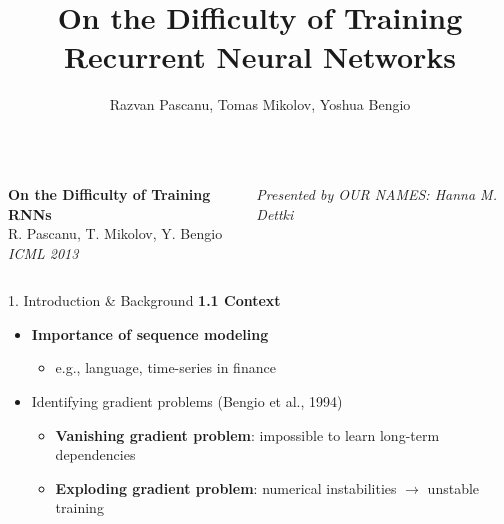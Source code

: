 \documentclass[final]{beamer}
\title{On the Difficulty of Training Recurrent Neural Networks}
\author{Razvan Pascanu, Tomas Mikolov, Yoshua Bengio}
\institute{ICML 2013}
\begin{document}
\begin{frame}[t]
    \begin{columns}[t,totalwidth=\textwidth]
    \begin{column}{0.66\textwidth}
      \vspace{1em}
      {\centering
        {\veryHuge\bfseries On the Difficulty of Training RNNs}\\[0.5em]
        {\Huge R. Pascanu, T. Mikolov, Y. Bengio}\\[0.5em]
        {\Large\itshape ICML 2013}\\
      }
    \end{column}
    \begin{column}{0.33\textwidth}
      \flushright
      \Large \textit{Presented by OUR NAMES: Hanna M. Dettki}
    \end{column}
  \end{columns}
  \vspace{2em}

  \begin{columns}[t,totalwidth=\textwidth]

    \begin{column}{0.33\textwidth}
      \begin{block}{1. Introduction \& Background}
        \textbf{1.1 Context}
            \begin{itemize}
            \item \textbf{Importance of sequence modeling}
            \begin{itemize}
                \item e.g., language, time-series in finance
            \end{itemize}

            \item Identifying gradient problems (Bengio et al., 1994)
            \begin{itemize}
                \item \textbf{Vanishing gradient problem}: impossible to learn long-term dependencies
                \item \textbf{Exploding gradient problem}: numerical instabilities $\rightarrow$ unstable training
            \end{itemize}


\end{itemize}
\end{block}
\end{column}
\end{columns}
\end{frame}
\end{document}
